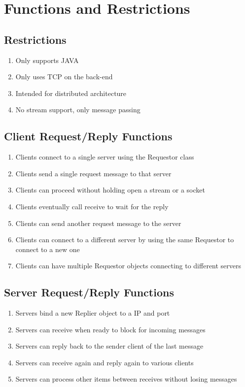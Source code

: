 \documentclass[11pt,journal,compsoc]{IEEEtran}
\begin{document}
\section{Functions and Restrictions}

\subsection{Restrictions}

\begin{enumerate}
\item Only supports JAVA
\item Only uses TCP on the back-end
\item Intended for distributed architecture
\item No stream support, only message passing
\end{enumerate}


\subsection{Client Request/Reply Functions}
\begin{enumerate}
    \item Clients connect to a single server using the Requestor class
    \item Clients send a single request message to that server
    \item Clients can proceed without holding open a stream or a socket
    \item Clients eventually call receive to wait for the reply
    \item Clients can send another request message to the server
    \item Clients can connect to a different server by using the same Requestor to connect to a new one
    \item Clients can have multiple Requestor objects connecting to different servers
\end{enumerate}

\subsection{Server Request/Reply Functions}
\begin{enumerate}
    \item Servers bind a new Replier object to a IP and port
    \item Servers can receive when ready to block for incoming messages
    \item Servers can reply back to the sender client of the last message
    \item Servers can receive again and reply again to various clients
    \item Servers can process other items between receives without losing messages
\end{enumerate}
\end{document}
